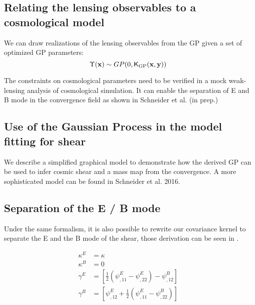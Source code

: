 \subsection{Relating the lensing observables to a cosmological model}


We can draw realizations of the lensing observables from the GP given a set of
optimized GP parameters:
\begin{equation}
	\Upsilon(\mathbf{x}) \sim GP(0, \mathsf{K}_{\rm GP}(\mathbf{x}, \mathbf{y})) 
\end{equation}


The constraints on cosmological parameters need to be verified in a mock
weak-lensing analysis of cosmological simulation. 
It can enable the separation of E and B mode in the convergence field as shown
in Schneider et al. (in prep.) 

\subsection{Use of the Gaussian Process in the model fitting for shear}
We describe a simplified graphical model to demonstrate how the derived GP can
be used to infer cosmic shear and a mass map from the convergence.
A more sophisticated model can be found in Schneider et al. 2016.








\subsection{Separation of the E / B mode}
Under the same formalism, it is also possible to rewrite our covariance kernel 
to separate the E and the B mode of the shear, those derivation can be seen in  
\cite{Schneider2001a}.

\begin{align}
	\kappa^E & = \kappa\\
	\kappa^B & = 0 \\
	\gamma^E &= \left[\frac{1}{2} (\psi^E_{,11} - \psi^E_{,22}) -
	\psi^B_{,12}\right]\\
	\gamma^B &= \left[\psi^E_{,12} + \frac{1}{2} (\psi^E_{,11} - \psi^B_{,22})\right]
\end{align}


